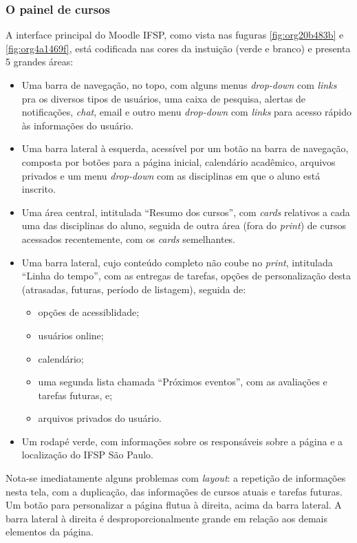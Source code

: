 \documentclass[11pt]{article}
\begin{document}
\subsubsection*{O painel de cursos}
\label{sec:org7c773eb}
A interface principal do Moodle IFSP, como vista nas fuguras
\ref{fig:org20b483b} e \ref{fig:org4a1469f}, está codificada nas cores da instuição (verde e branco)
e presenta 5 grandes áreas:
\begin{itemize}
\item Uma barra de navegação, no topo, com alguns menus \emph{drop-down} com
\emph{links} pra os diversos tipos de usuários, uma caixa de pesquisa,
alertas de notificações, \emph{chat}, email e outro menu \emph{drop-down} com
\emph{links} para acesso rápido às informações do usuário.
\item Uma barra lateral à esquerda, acessível por um botão na barra de
navegação, composta por botões para a página inicial, calendário
acadêmico, arquivos privados e um menu \emph{drop-down} com as
disciplinas em que o aluno está inscrito.
\item Uma área central, intitulada ``Resumo dos cursos'', com \emph{cards}
relativos a cada uma das disciplinas do aluno, seguida de outra área
(fora do \emph{print}) de cursos acessados recentemente, com os \emph{cards} semelhantes.
\item Uma barra lateral, cujo conteúdo completo não coube no \emph{print},
intitulada ``Linha do tempo'', com as entregas de tarefas, opções de
personalização desta (atrasadas, futuras, período de listagem),
seguida de:
\begin{itemize}
\item opções de acessiblidade;
\item usuários online;
\item calendário;
\item uma segunda lista chamada ``Próximos eventos'', com as avaliações
e tarefas futuras, e;
\item arquivos privados do usuário.
\end{itemize}
\item Um rodapé verde, com informações sobre os responsáveis sobre a
página e a localização do IFSP São Paulo.
\end{itemize}

Nota-se imediatamente alguns problemas com \emph{layout}: a repetição de
informações nesta tela, com a duplicação, das informações de
cursos atuais e tarefas futuras. Um botão para personalizar a página
flutua à direita, acima da barra lateral. A barra lateral à direita é
desproporcionalmente grande em relação aos demais elementos da página.
\end{document}

